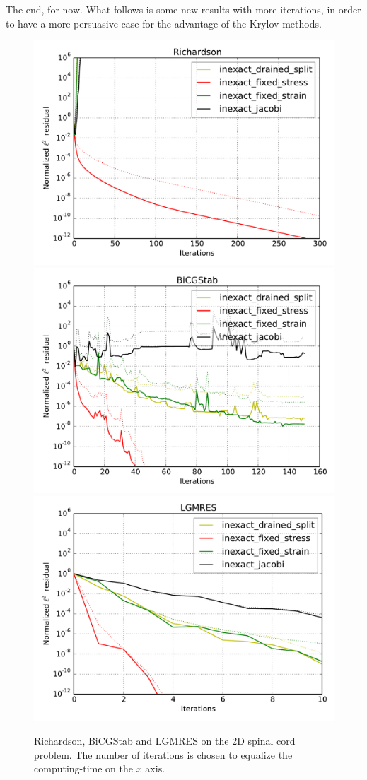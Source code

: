 \documentclass{article}
\begin{document}
\FloatBarrier

The end, for now. What follows is some new results with more iterations, in
order to have a more persuasive case for the advantage of the Krylov methods.

\begin{figure}
\begin{center}
\includegraphics[width=0.32\linewidth]{../new-Richardson,problem=2,exact=0,N=64,cycles=1.pdf}
\includegraphics[width=0.32\linewidth]{../new-BiCGStab,problem=2,exact=0,N=64,cycles=1.pdf}
\includegraphics[width=0.32\linewidth]{../new-LGMRES,problem=2,exact=0,N=64,cycles=1.pdf}
\caption{Richardson, BiCGStab and LGMRES on the 2D spinal cord problem. The number of iterations is chosen to equalize the computing-time on the $x$ axis.} 
\label{new-2dsc-inexact}
\end{center}
\end{figure}
\end{document}
